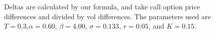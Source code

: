 

\begin{figure}[!tbp]
    \centering
    \hfill
    \caption{Deltas are calculated by our formula, and take call option price differences and divided by vol differences. The parameters used are $T=0.3$,$\alpha = 0.60$, $\beta = 4.00$, $\sigma = 0.133$, $r = 0.05$, and $K= 0.15$.  }
  \end{figure}


